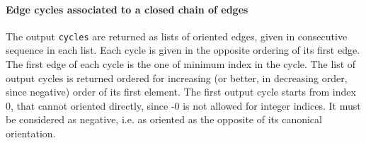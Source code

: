 \documentclass[11pt,oneside]{article}	%
\begin{document}
\paragraph{Edge cycles associated to a closed chain of edges}

The output \texttt{cycles} are returned as lists of oriented edges, given in consecutive  sequence in each list. Each cycle is given in the opposite ordering of its first edge.
The first edge of each cycle is the one of minimum index in the cycle. The list of output cycles is returned ordered for increasing (or better, in decreasing order, since negative) order of its first element. The first output cycle starts from index 0, that cannot oriented directly, since -0 is not allowed for integer indices. It must be considered as negative, i.e. as oriented as the opposite of its canonical orientation. 
\end{document}
